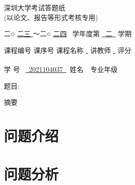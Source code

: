 \documentclass[UTF8]{ctexart}
\begin{document}

\linespread{1.1666}


\begin{center}

    \huge{深圳大学考试答题纸} \\
    \vspace{0.2cm} 
    \normalsize{(以论文、报告等形式考核专用)} \\
    \vspace{0.2cm}

\large{二○ \underline{\quad 二三 \quad } ～二○  \underline{\quad 二四\quad } \, 学年度第  \underline{\, 二 \,}   学期}
\end{center} 
\vspace{0.02cm}
\large{
    课程编号\underline{} 课序号 \underline{\quad} 
    课程名称 \underline{\,\,} 讲教师 \underline{\,\,} 
    评分 \underline{\quad} }
\\
\\
\noindent
\large{
学 \qquad 号 \, \underline{ \, 2021104037 \,} \quad
\,姓名 \, \underline{\;  \; } 
\,专业年级 \quad \underline{ \qquad  \qquad}\\
}

\noindent{}

\vspace{0.29cm}
\noindent
题目: 
\begin{center}

\underline{\qquad \qquad \textbf{\heiti  } \qquad \qquad}

\end{center}


\newpage

\begin{center}

\underline{\qquad \qquad \textbf{\heiti  } \qquad \qquad}

\end{center}
\fangsong
\begin{center}
    {\heiti 摘要}
\end{center}
\par


\section{问题介绍}


\section{问题分析}




\end{document}

